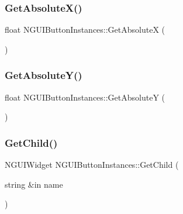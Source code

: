 \subsubsection{\texorpdfstring{Get\+Absolute\+X()}{GetAbsoluteX()}}
{\footnotesize\ttfamily float N\+G\+U\+I\+Button\+Instances\+::\+Get\+AbsoluteX (\begin{DoxyParamCaption}{ }\end{DoxyParamCaption})}

\hypertarget{class_n_g_u_i_button_instances_a22ddb71f24accdb17ef19bb32d56e3b4}{}\label{class_n_g_u_i_button_instances_a22ddb71f24accdb17ef19bb32d56e3b4} 
\subsubsection{\texorpdfstring{Get\+Absolute\+Y()}{GetAbsoluteY()}}
{\footnotesize\ttfamily float N\+G\+U\+I\+Button\+Instances\+::\+Get\+AbsoluteY (\begin{DoxyParamCaption}{ }\end{DoxyParamCaption})}

\hypertarget{class_n_g_u_i_button_instances_a1c7010b54a09546570c7247f40b9e3d1}{}\label{class_n_g_u_i_button_instances_a1c7010b54a09546570c7247f40b9e3d1} 
\subsubsection{\texorpdfstring{Get\+Child()}{GetChild()}\hspace{0.1cm}{\footnotesize\ttfamily [1/2]}}
{\footnotesize\ttfamily N\+G\+U\+I\+Widget N\+G\+U\+I\+Button\+Instances\+::\+Get\+Child (\begin{DoxyParamCaption}\item[{string \&in}]{name }\end{DoxyParamCaption})}

\hypertarget{class_n_g_u_i_button_instances_a6fde6f52006237e45791f0981877470c}{}\label{class_n_g_u_i_button_instances_a6fde6f52006237e45791f0981877470c} 

